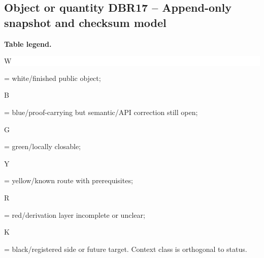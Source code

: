 \subsection*{Object or quantity DBR17 -- Append-only snapshot and checksum model}
\hypertarget{objproof:DBR17}{}
\par\smallskip\noindent\begin{minipage}{0.99\linewidth}\footnotesize\raggedright\textbf{Table legend.} \colorbox{white}{\strut W} = white/finished public object; \colorbox{cyan!20}{\strut B} = blue/proof-carrying but semantic/API correction still open; \colorbox{green!18}{\strut G} = green/locally closable; \colorbox{yellow!25}{\strut Y} = yellow/known route with prerequisites; \colorbox{red!20}{\strut R} = red/derivation layer incomplete or unclear; \colorbox{black!18}{\strut K} = black/registered side or future target. Context class is orthogonal to status.\end{minipage}\par\vspace{0.25em}
